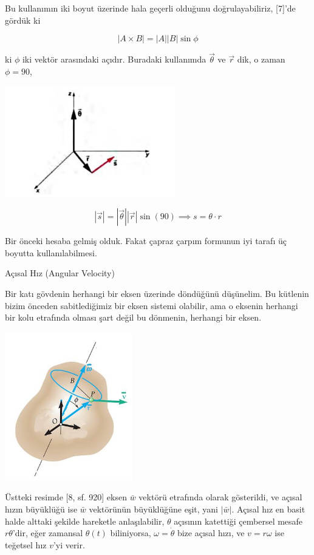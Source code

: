 \documentclass[12pt,fleqn]{article}\usepackage{../../common}
\begin{document}
Bu kullanımın iki boyut üzerinde hala geçerli olduğunu doğrulayabiliriz, [7]'de
gördük ki

$$
|A \times B| = |A||B|\sin\phi
$$

ki $\phi$ iki vektör arasındaki açıdır. Buradaki kullanımda $\vec{\theta}$ ve
$\vec{r}$ dik, o zaman $\phi=90$,

\includegraphics[width=20em]{phy_005_basics_02_05.jpg}

$$
|\vec{s}| = |\vec{\theta}| |\vec{r}| \sin(90) \implies s = \theta \cdot r
$$

Bir önceki hesaba gelmiş olduk. Fakat çapraz çarpım formunun iyi tarafı
üç boyutta kullanılabilmesi. 


Açısal Hız (Angular Velocity)

Bir katı gövdenin herhangi bir eksen üzerinde döndüğünü düşünelim.  Bu kütlenin
bizim önceden sabitlediğimiz bir eksen sistemi olabilir, ama o eksenin herhangi
bir kolu etrafında olması şart değil bu dönmenin, herhangi bir eksen.

\includegraphics[width=15em]{phy_005_basics_02_14.jpg}

Üstteki resimde [8, sf. 920] eksen $\bar{w}$ vektörü etrafında olarak
gösterildi, ve açısal hızın büyüklüğü ise $\bar{w}$ vektörünün büyüklüğüne eşit,
yani $|\bar{w}|$.  Açısal hız en basit halde alttaki şekilde hareketle
anlaşılabilir, $\theta$ açısının katettiği çembersel mesafe $r\theta$'dir, eğer
zamansal $\theta(t)$ biliniyorsa, $\omega = \dot{\theta}$ bize açısal hızı, ve
$v = r\omega$ ise teğetsel hız $v$'yi verir.
\end{document}
